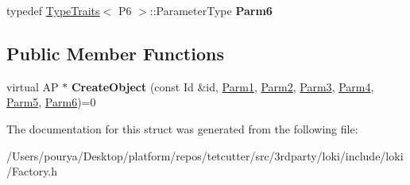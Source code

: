 \begin{DoxyCompactItemize}
\item 
\hypertarget{structLoki_1_1FactoryImpl_3_01AP_00_01Id_00_01LOKI__TYPELIST__6_07P1_00_01P2_00_01P3_00_01P4_00_01P5_00_01P6_08_4_aad4cab17fa6f9689cb05b813ce5a4815}{}typedef \hyperlink{classLoki_1_1TypeTraits}{Type\+Traits}$<$ P6 $>$\+::Parameter\+Type {\bfseries Parm6}\label{structLoki_1_1FactoryImpl_3_01AP_00_01Id_00_01LOKI__TYPELIST__6_07P1_00_01P2_00_01P3_00_01P4_00_01P5_00_01P6_08_4_aad4cab17fa6f9689cb05b813ce5a4815}

\end{DoxyCompactItemize}
\subsection*{Public Member Functions}
\begin{DoxyCompactItemize}
\item 
\hypertarget{structLoki_1_1FactoryImpl_3_01AP_00_01Id_00_01LOKI__TYPELIST__6_07P1_00_01P2_00_01P3_00_01P4_00_01P5_00_01P6_08_4_ae8e2d603ae674e81e1e41424de840397}{}virtual A\+P $\ast$ {\bfseries Create\+Object} (const Id \&id, \hyperlink{classLoki_1_1EmptyType}{Parm1}, \hyperlink{classLoki_1_1EmptyType}{Parm2}, \hyperlink{classLoki_1_1EmptyType}{Parm3}, \hyperlink{classLoki_1_1EmptyType}{Parm4}, \hyperlink{classLoki_1_1EmptyType}{Parm5}, \hyperlink{classLoki_1_1EmptyType}{Parm6})=0\label{structLoki_1_1FactoryImpl_3_01AP_00_01Id_00_01LOKI__TYPELIST__6_07P1_00_01P2_00_01P3_00_01P4_00_01P5_00_01P6_08_4_ae8e2d603ae674e81e1e41424de840397}

\end{DoxyCompactItemize}


The documentation for this struct was generated from the following file\+:\begin{DoxyCompactItemize}
\item 
/\+Users/pourya/\+Desktop/platform/repos/tetcutter/src/3rdparty/loki/include/loki/Factory.\+h\end{DoxyCompactItemize}
